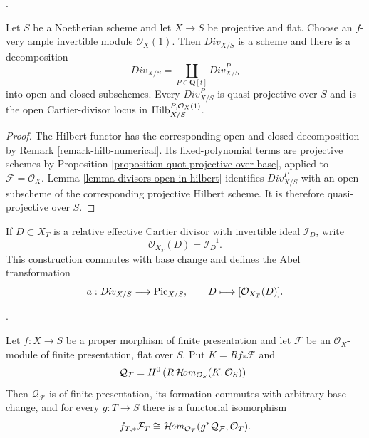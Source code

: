 \begin{proposition}
\label{proposition-divisors-projective-flat}
\begin{reference}
\cite[Expos\'e 232, Proposition 4.1, p. 152]{FGA}.
\end{reference}
Let $S$ be a Noetherian scheme and let $X \to S$ be projective and flat.
Choose an $f$-very ample invertible module $\mathcal{O}_X(1)$. Then
$\mathit{Div}_{X/S}$ is a scheme and there is a decomposition
$$
\mathit{Div}_{X/S} =
\coprod_{P \in \mathbf{Q}[t]} \mathit{Div}^P_{X/S}
$$
into open and closed subschemes. Every $\mathit{Div}^P_{X/S}$ is
quasi-projective over $S$ and is the open Cartier-divisor locus in
$\mathrm{Hilb}^{P, \mathcal{O}_X(1)}_{X/S}$.
\end{proposition}

\begin{proof}
The Hilbert functor has the corresponding open and closed decomposition by
Remark \ref{remark-hilb-numerical}. Its fixed-polynomial terms are
projective schemes by Proposition
\ref{proposition-quot-projective-over-base}, applied to
$\mathcal{F} = \mathcal{O}_X$. Lemma
\ref{lemma-divisors-open-in-hilbert} identifies
$\mathit{Div}^P_{X/S}$ with an open subscheme of the corresponding
projective Hilbert scheme. It is therefore quasi-projective over $S$.
\end{proof}

\noindent
If $D \subset X_T$ is a relative effective Cartier divisor with invertible
ideal $\mathcal{I}_D$, write
$$
\mathcal{O}_{X_T}(D) = \mathcal{I}_D^{-1}.
$$
This construction commutes with base change and defines the Abel
transformation
\begin{equation}
\label{equation-divisor-to-picard}
a : \mathit{Div}_{X/S} \longrightarrow \mathrm{Pic}_{X/S},
\qquad
D \longmapsto [\mathcal{O}_{X_T}(D)].
\end{equation}

\begin{lemma}
\label{lemma-universal-module-of-sections}
\begin{reference}
\cite[Expos\'e 232, Section 4, pp. 152--153]{FGA}.
\end{reference}
Let $f : X \to S$ be a proper morphism of finite presentation and let
$\mathcal{F}$ be an $\mathcal{O}_X$-module of finite presentation, flat over
$S$. Put $K = Rf_*\mathcal{F}$ and
$$
\mathcal{Q}_{\mathcal{F}} =
H^0\left(R\mathop{\mathcal{H}\!\mathit{om}}\nolimits_{\mathcal{O}_S}(K, \mathcal{O}_S)\right).
$$
Then $\mathcal{Q}_{\mathcal{F}}$ is of finite presentation, its formation
commutes with arbitrary base change, and for every $g : T \to S$ there is a
functorial isomorphism
\begin{equation}
\label{equation-universal-module-of-sections}
f_{T, *}\mathcal{F}_T \cong
\mathop{\mathcal{H}\!\mathit{om}}\nolimits_{\mathcal{O}_T}(g^*\mathcal{Q}_{\mathcal{F}}, \mathcal{O}_T).
\end{equation}
\end{lemma}

